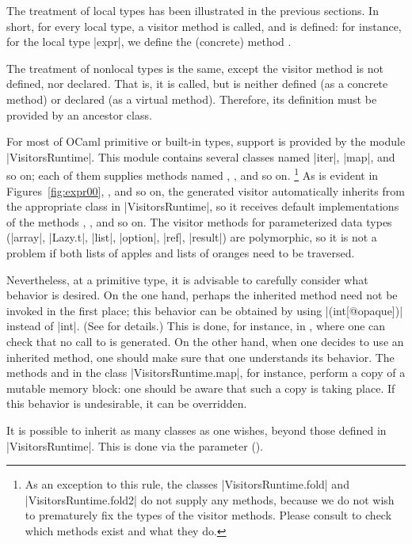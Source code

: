 \documentclass[11pt,a4paper,twoside]{article}
\begin{document}
The treatment of local types has been illustrated in the previous sections. In
short, for every local type, a visitor method is called, and is defined:
for instance, for the local type \oc|expr|, we define the (concrete) method
.

The treatment of nonlocal types is the same, except the visitor method is not
defined, nor declared. That is, it is called, but is neither defined (as a
concrete method) or declared (as a virtual method). Therefore, its definition
must be provided by an ancestor class.

For most of OCaml primitive or built-in types, support is provided by the
module \oc|VisitorsRuntime|. This module contains several classes named
\oc|iter|, \oc|map|, and so on; each of them supplies methods named
, , and so on.%
%
\footnote{As an exception to this rule, the classes \oc|VisitorsRuntime.fold|
  and \oc|VisitorsRuntime.fold2| do not supply any methods, because we do not
  wish to prematurely fix the types of the visitor methods. Please consult
   to check which methods exist and what they
  do.} %
%
As is evident in Figures~\ref{fig:expr00}, , and so on, the
generated visitor automatically inherits from the appropriate class in
\oc|VisitorsRuntime|, so it receives default implementations of the methods
, , and so on. The visitor methods for
parameterized data types (\oc|array|, \oc|Lazy.t|, \oc|list|, \oc|option|,
\oc|ref|, \oc|result|) are polymorphic, so it is not a problem if both lists
of apples and lists of oranges need to be traversed.

Nevertheless, at a primitive type, it is advisable to carefully consider what
behavior is desired. On the one hand, perhaps the inherited method
 need not be invoked in the first place; this behavior can
be obtained by using \oc|(int[@opaque])| instead of \oc|int|. (See
 for details.) This is done, for instance, in
, where one can check that no call to  is
generated. On the other hand, when one decides to use an inherited method, one
should make sure that one understands its behavior. The methods
 and  in the class
\oc|VisitorsRuntime.map|, for instance, perform a copy of a mutable memory
block: one should be aware that such a copy is taking place. If this behavior
is undesirable, it can be overridden.

It is possible to inherit as many classes as one wishes, beyond those defined
in \oc|VisitorsRuntime|. This is done via the \ancestors parameter
().
\end{document}
